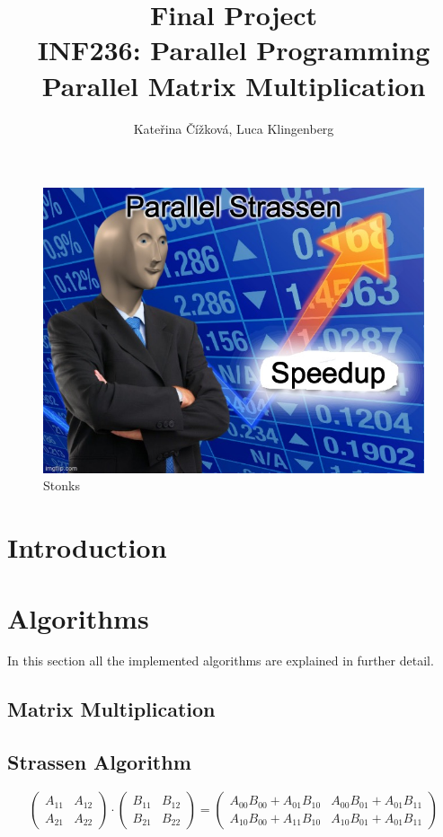 \documentclass{article}
\title{Final Project\\ INF236: Parallel Programming\\ Parallel Matrix Multiplication}
\author{Kate\v{r}ina \v{C}\'{i}\v{z}kov\'{a}, Luca Klingenberg}
\begin{document}
\maketitle

\begin{figure}[htbp]
\centerline{\includegraphics[scale=.5]{58mo62.jpg}}
\caption{Stonks}
\label{fig}
\end{figure}

\section{Introduction}

\section{Algorithms}
In this section all the implemented algorithms are explained in further detail.

\subsection{Matrix Multiplication}

\subsection{Strassen Algorithm}

$$
\begin{pmatrix}
A_{11} & A_{12} \\
A_{21} & A_{22} 
\end{pmatrix}
\cdot
\begin{pmatrix}
B_{11} & B_{12} \\
B_{21} & B_{22} 
\end{pmatrix}
=
\begin{pmatrix}
A_{00}B_{00}+A_{01}B_{10} & A_{00}B_{01}+A_{01}B_{11} \\
A_{10}B_{00}+A_{11}B_{10} & A_{10}B_{01}+A_{01}B_{11} 
\end{pmatrix}
$$
\end{document}
